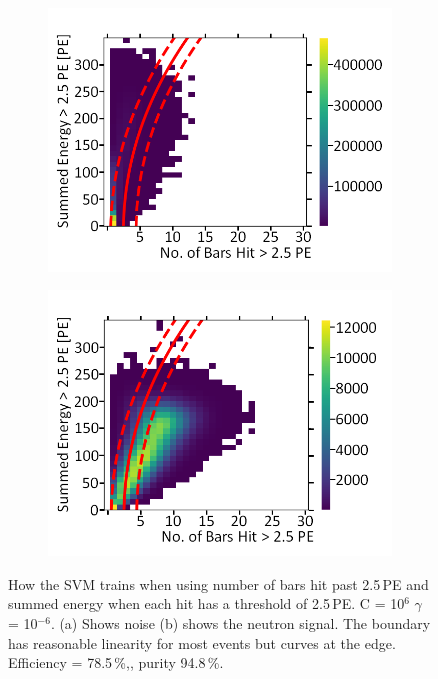 \begin{figure}[!h]
\centering
\begin{subfigure}{.5\textwidth}
  \centering
  \includegraphics[width=\linewidth]{Appendix1/Figs/Bars1Sum1Noise.png}
  \captionsetup{width=.9\linewidth}
  \caption{}
  \label{subFig:Bars1Sum1N}
\end{subfigure}%
\begin{subfigure}{.5\textwidth}
  \centering
\includegraphics[width=\linewidth]{Appendix1/Figs/Bars1Sum1Signal.png}
  \captionsetup{width=.9\linewidth}
  \caption{}
  \label{subFig:Bars1Sum1S}
\end{subfigure}
\caption[LIBLINEAR SVM Nyström approximated RBF kernel for number of bars hit > 2.5\,PE vs summed energy > 2.5\,PE.]{How the SVM trains when using number of bars hit past 2.5\,PE and summed energy when each hit has a threshold of 2.5\,PE. C = 10$^6$ $\gamma$ = 10$^{-6}$. (a) Shows noise (b) shows the neutron signal. The boundary has reasonable linearity for most events but curves at the edge. Efficiency = 78.5\,\%,, purity 94.8\,\%.}
\label{fig:Bars1Sum1SN}
\end{figure}

